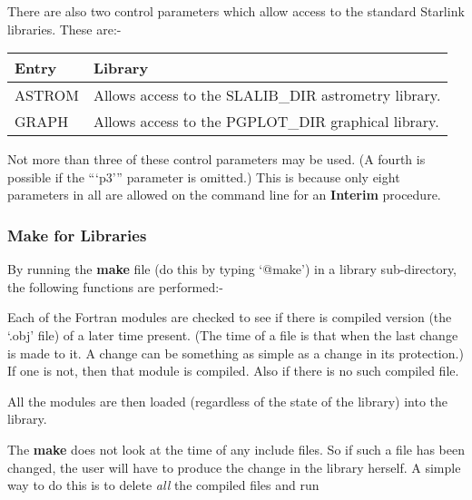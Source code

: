 \begin{enumerate}
       There are also two control parameters which allow access to the
       standard Starlink libraries. These are:-

      \begin{tabular}{|l|p{3in}|}\hline
       Entry & Library \\ \hline
       ASTROM & Allows access to the SLALIB\_DIR astrometry library. \\
       GRAPH  & Allows access to the PGPLOT\_DIR graphical library. \\ \hline
       \end{tabular}

       Not more than three of these control parameters may be used. (A 
      fourth is possible if the ``{`p3'}'' parameter is omitted.) This 
       is because only eight parameters in all are allowed on the command
       line for an {\bf Interim} procedure.

\end{enumerate}

\subsubsection{Make for Libraries}


\vspace*{3mm}

By running the {\bf make} file (do this by typing `@make') in a library
sub-directory, the following functions are performed:-

\begin{list}{{-}}{}
\item Each of the Fortran modules
are checked to see if there is compiled version (the `.obj' file) of a 
later time present. (The time of a file is that when the last change is 
made to it. A change can be something as simple as a change in its 
protection.) If one is not, then that module is compiled. Also if there
is no such compiled file.

\item All the modules are then loaded (regardless of the state of the 
      library) into the library.

\end{list}

The {\bf make} does not look at the time of any include files. So if such
a file has been changed, the user will have to produce the change in the
library herself.
A simple way to do this is to delete {\em all} the compiled files and
run 

